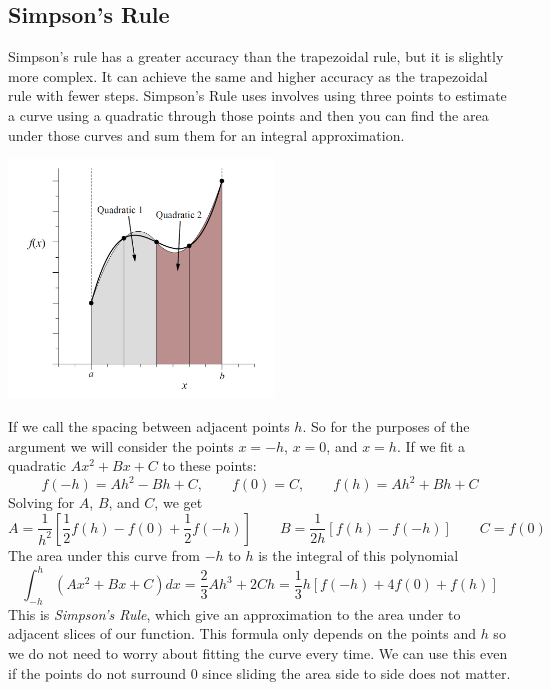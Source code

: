     \subsection{Simpson's Rule}
        Simpson's rule has a greater accuracy than the trapezoidal rule, but it is slightly more complex. It can achieve the same and higher accuracy as the trapezoidal rule with fewer steps. 
        \newline \indent
        Simpson's Rule uses involves using three points to estimate a curve using a quadratic through those points and then you can find the area under those curves and sum them for an integral approximation. 
        \begin{center}
            \includegraphics[width=200pt]{simpsons_rule.png}
        \end{center}
        If we call the spacing between adjacent points $h$. So for the purposes of the argument we will consider the points $x = -h$, $x = 0$, and $x = h$. If we fit a quadratic $Ax^2 + Bx + C$ to these points:
        \begin{equation*}
            f(-h) = Ah^2 - Bh + C, \qquad f(0) = C, \qquad f(h) = Ah^2 + Bh + C
        \end{equation*}
        Solving for $A$, $B$, and $C$, we get
        \begin{equation*}
            A = \frac{1}{h^2}[\frac{1}{2}f(h) - f(0) + \frac{1}{2}f(-h)] \qquad B = \frac{1}{2h}[f(h) - f(-h)] \qquad C = f(0)
        \end{equation*}
        The area under this curve from $-h$ to $h$ is the integral of this polynomial
        \begin{equation*}
            \int_{-h}^h (Ax^2 + Bx + C) dx = \frac{2}{3}Ah^3 + 2Ch = \frac{1}{3}h[f(-h) + 4f(0) + f(h)]
        \end{equation*}
        This is \textit{Simpson's Rule}, which give an approximation to the area under to adjacent slices of our function. This formula only depends on the points and $h$ so we do not need to worry about fitting the curve every time. We can use this even if the points do not surround 0 since sliding the area side to side does not matter.
